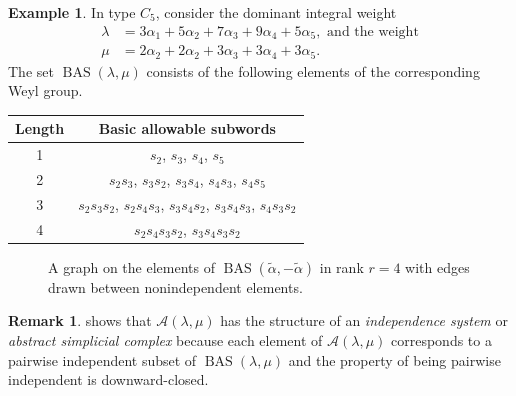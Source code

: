 \documentclass{amsart}
\theoremstyle{definition}
\newtheorem{example}[theorem]{Example}
\newtheorem{remark}[theorem]{Remark}
\DeclareMathOperator{\BAS}{BAS}
\newcommand{\hroot}{\tilde{\alpha}}
\newcommand{\calA}{\mathcal{A}}
\begin{document}
\begin{example}
    In type $C_5$, consider the dominant integral weight \begin{align*}
        \lambda&=3\alpha_1+5\alpha_2+7\alpha_3+9\alpha_4+5\alpha_5,\text{ and the weight}\\
        \mu&=2\alpha_2+2\alpha_2+3\alpha_3+3\alpha_4+3\alpha_5.
    \end{align*} The set $\BAS(\lambda,\mu)$ consists of the following elements of the corresponding Weyl group.
    \begin{center}
          \begin{tabular}{c|c}
              Length & Basic allowable subwords \\ \hline
              1 & $s_2$, $s_3$, $s_4$, $s_5$\\
              2 & $s_2s_3$, $s_3s_2$, $s_3s_4$, $s_4s_3$, $s_4s_5$\\
              3 & $s_2s_3s_2$, $s_2s_4s_3$, $s_3s_4s_2$, $s_3s_4s_3$, $s_4s_3s_2$\\
              4 & $s_2s_4s_3s_2$, $s_3s_4s_3s_2$
          \end{tabular}
      \end{center}
\end{example}

\begin{figure}
    \centering
{}
    \caption{A graph on the elements of $\BAS(\hroot,-\hroot)$ in rank $r=4$ with edges drawn between nonindependent elements.}
    \label{fig:dependence_graph}
\end{figure}

\begin{remark}
     shows that $\calA(\lambda,\mu)$ has the structure of an \textit{independence system} or \textit{abstract simplicial complex} because each element of $\calA(\lambda,\mu)$ corresponds to a pairwise independent subset of $\BAS(\lambda,\mu)$ and the property of being pairwise independent is downward-closed.
\end{remark}
\end{document}
